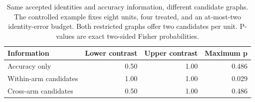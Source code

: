 \begin{table}[htbp]\centering
\caption{Same accepted identities and accuracy information, different candidate graphs.
The controlled example fixes eight units, four treated, and an at-most-two identity-error
budget. Both restricted graphs offer two candidates per unit. P-values are exact
two-sided Fisher probabilities.}\label{tab:example}
\begin{tabular}{lrrr}\toprule
Information & Lower contrast & Upper contrast & Maximum p \\
\midrule
Accuracy only & 0.50 & 1.00 & 0.486 \\
Within-arm candidates & 1.00 & 1.00 & 0.029 \\
Cross-arm candidates & 0.50 & 1.00 & 0.486 \\
\bottomrule\end{tabular}\end{table}
